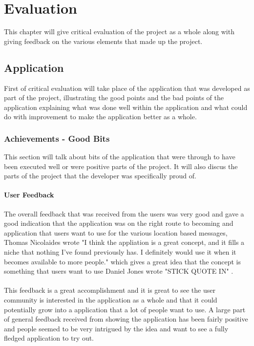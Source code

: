 \chapter{Evaluation}

This chapter will give critical evaluation of the project as a whole along with giving feedback on the various elements that made up the project.

\section{Application}

First of critical evaluation will take place of the application that was developed as part of the project, illustrating the good points and the bad points of the application explaining what was done well within the application and what could do with improvement to make the application better as a whole.

\subsection{Achievements - Good Bits}

This section will talk about bits of the application that were through to have been executed well or were positive parts of the project. It will also discus the parts of the project that the developer was specifically proud of.

\subsubsection{User Feedback}

The overall feedback that was received from the users was very good and gave a good indication that the application was on the right route to becoming and application that users want to use for the various location based messages, Thomas Nicolaides wrote "I think the appliation is a great concept, and it fills a niche that nothing I've found previously has. I definitely would use it when it becomes available to more people." which gives a great idea that the concept is something that users want to use Daniel Jones wrote "{STICK QUOTE IN}" .\\
\\
This feedback is a great accomplishment and it is great to see the user community is interested in the application as a whole and that it could potentially grow into a application that a lot of people want to use. A large part of general feedback received from showing the application has been fairly positive and people seemed to be very intrigued by the idea and want to see a fully fledged application to try out.

